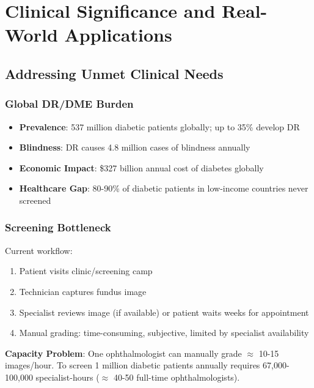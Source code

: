 \documentclass[12pt,a4paper]{article}
\begin{document}
\newpage

\section{Clinical Significance and Real-World Applications}

\subsection{Addressing Unmet Clinical Needs}

\subsubsection{Global DR/DME Burden}

\begin{itemize}
    \item \textbf{Prevalence}: 537 million diabetic patients globally; up to 35\% develop DR
    \item \textbf{Blindness}: DR causes 4.8 million cases of blindness annually
    \item \textbf{Economic Impact}: \$327 billion annual cost of diabetes globally
    \item \textbf{Healthcare Gap}: 80-90\% of diabetic patients in low-income countries never screened
\end{itemize}

\subsubsection{Screening Bottleneck}

Current workflow:
\begin{enumerate}
    \item Patient visits clinic/screening camp
    \item Technician captures fundus image
    \item Specialist reviews image (if available) or patient waits weeks for appointment
    \item Manual grading: time-consuming, subjective, limited by specialist availability
\end{enumerate}

\textbf{Capacity Problem}: One ophthalmologist can manually grade $\approx$ 10-15 images/hour. To screen 1 million diabetic patients annually requires 67,000-100,000 specialist-hours ($\approx$ 40-50 full-time ophthalmologists).
\end{document}
